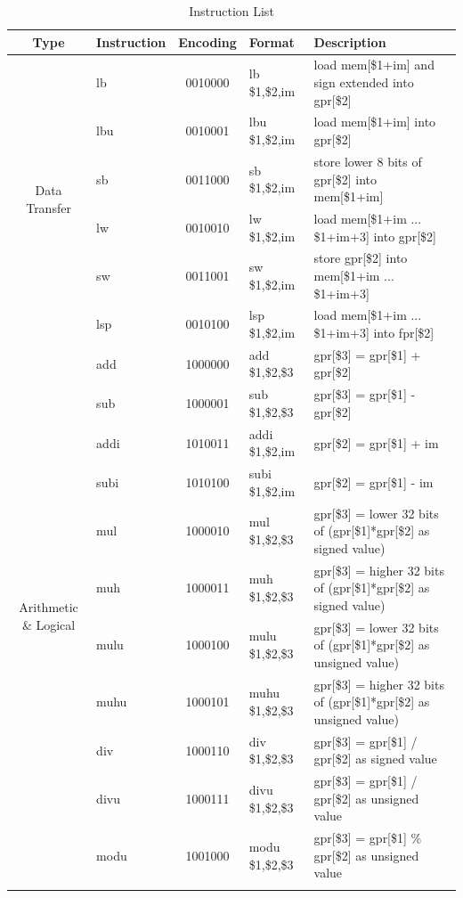 \documentclass{sig-alternate}
\begin{document}
\begin{table}
\caption{Instruction List}
\label{tab:il}
\centering
\begin{tabular}{|c|l|c|l|p{8cm}|}
\hline
Type & Instruction & Encoding & Format & Description \\
 \hline
\multirow{6}{*}{Data Transfer} & lb & 0010000 & lb \$1,\$2,im & load mem[\$1+im] and sign extended into gpr[\$2] \\ \cline{2-5}
 & lbu & 0010001 & lbu \$1,\$2,im & load mem[\$1+im] into gpr[\$2] \\ \cline{2-5}
 & sb & 0011000 & sb \$1,\$2,im & store lower 8 bits of gpr[\$2] into mem[\$1+im] \\ \cline{2-5}
 & lw & 0010010 & lw \$1,\$2,im & load mem[\$1+im ... \$1+im+3] into gpr[\$2]\\ \cline{2-5}
 & sw & 0011001 & sw \$1,\$2,im & store gpr[\$2] into mem[\$1+im ... \$1+im+3]\\ \cline{2-5}
 & lsp & 0010100 & lsp \$1,\$2,im & load mem[\$1+im ... \$1+im+3] into fpr[\$2] \\ \hline
\multirow{23}{*}{Arithmetic \& Logical} & add & 1000000 & add \$1,\$2,\$3 & gpr[\$3] = gpr[\$1] + gpr[\$2] \\ \cline{2-5}
 & sub & 1000001 & sub \$1,\$2,\$3& gpr[\$3] = gpr[\$1] - gpr[\$2] \\ \cline{2-5}  
 & addi & 1010011 & addi \$1,\$2,im & gpr[\$2] = gpr[\$1] + im \\ \cline{2-5}
 & subi & 1010100 & subi \$1,\$2,im &  gpr[\$2] = gpr[\$1] - im \\ \cline{2-5}
 & mul & 1000010 & mul \$1,\$2,\$3 & gpr[\$3] = lower 32 bits of (gpr[\$1]*gpr[\$2] as signed value) \\ \cline{2-5}
 & muh & 1000011 & muh \$1,\$2,\$3 & gpr[\$3] = higher 32 bits of (gpr[\$1]*gpr[\$2] as signed value) \\ \cline{2-5}
 & mulu & 1000100 & mulu \$1,\$2,\$3 & gpr[\$3] = lower 32 bits of (gpr[\$1]*gpr[\$2] as unsigned value) \\ \cline{2-5}  
 & muhu & 1000101 & muhu \$1,\$2,\$3 &  gpr[\$3] = higher 32 bits of (gpr[\$1]*gpr[\$2] as unsigned value) \\ \cline{2-5}
 & div & 1000110 & div \$1,\$2,\$3 & gpr[\$3] = gpr[\$1] / gpr[\$2] as signed value \\ \cline{2-5}
 & divu & 1000111 & divu \$1,\$2,\$3 & gpr[\$3] = gpr[\$1] / gpr[\$2] as unsigned value \\ \cline{2-5}
 & modu & 1001000 & modu \$1,\$2,\$3 & gpr[\$3] = gpr[\$1] \% gpr[\$2] as unsigned value \\ \cline{2-5}

\end{tabular}
\end{table}
\end{document}
